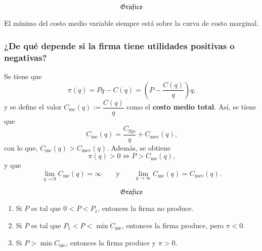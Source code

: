\documentclass{report}
\newcommand{\GRAF}{\begin{center}$$\mathfrak{Gr\acute{a}fico}$$\end{center}}
\begin{document}
\GRAF

El mínimo del costo medio variable siempre está sobre la curva de costo marginal.

\subsubsection{¿De qué depende si la firma tiene utilidades positivas o negativas?}

Se tiene que
\[
\pi\!\left(q\right)=Pq-C\!\left(q\right)=\left(P-\frac{C\!\left(q\right)}{q}\right)q\text{,}
\]
y se define el valor $C_\text{me}\!\left(q\right):=\dfrac{C\!\left(q\right)}{q}$ como el \textbf{costo medio total}. Así, se tiene que
\[
C_\text{me}\!\left(q\right)=\frac{C_\text{fijo}}{q}+C_\text{mev}\!\left(q\right)\text{,}
\]
con lo que, $C_\text{me}\!\left(q\right)>C_\text{mev}\!\left(q\right)$. Además, se obtiene
\[
\pi\!\left(q\right)>0\Leftrightarrow P>C_\text{me}\!\left(q\right)\text{,}
\]
y que
\[
\lim_{q\to0}C_\text{me}\!\left(q\right)=\infty\qquad\text{y}\qquad\lim_{q\to\infty}C_\text{me}\!\left(q\right)=C_\text{mev}\!\left(q\right)\text{.}
\]

\GRAF

\begin{enumerate}
\item Si $P$ es tal que $0<P<P_1$, entonces la firma no produce.
\item Si $P$ es tal que $P_1<P<\min C_\text{me}$, entonces la firma produce, pero $\pi<0$.
\item Si $P>\min C_\text{me}$, entonces la firma produce y $\pi>0$.
\end{enumerate}

\end{document}

